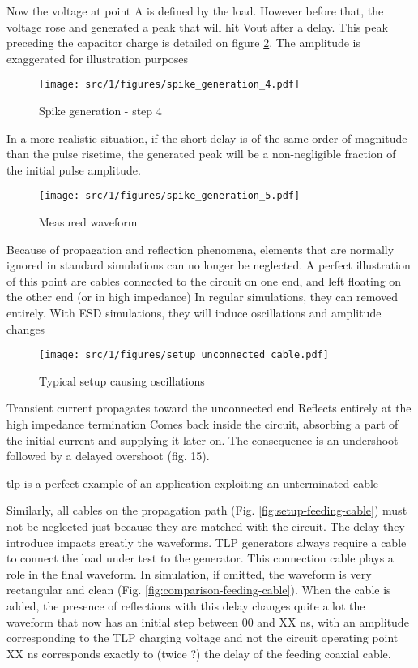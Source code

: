 Now the voltage at point A is defined by the load.
However before that, the voltage rose and generated a peak that will hit Vout after a delay.
This peak preceding the capacitor charge is detailed on figure \ref{fig:spike-step-4}.
The amplitude is exaggerated for illustration purposes

\begin{figure}[!h]
  \centering
  \texttt{[image: src/1/figures/spike\_generation\_4.pdf]}
  \caption{Spike generation - step 4}
  \label{fig:spike-step-4}
\end{figure}

In a more realistic situation, if the short delay is of the same order of magnitude than the pulse risetime, the generated peak will be a non-negligible fraction of the initial pulse amplitude.

\begin{figure}[!h]
  \centering
  \texttt{[image: src/1/figures/spike\_generation\_5.pdf]}
  \caption{Measured waveform}
  \label{fig:spike-step-4}
\end{figure}

Because of propagation and reflection phenomena, elements that are normally ignored in standard simulations can no longer be neglected.
A perfect illustration of this point are cables connected to the circuit on one end, and left floating on the other end (or in high impedance)
In regular simulations, they can removed entirely.
With ESD simulations, they will induce oscillations and amplitude changes

\begin{figure}[!h]
  \centering
  \texttt{[image: src/1/figures/setup\_unconnected\_cable.pdf]}
  \caption{Typical setup causing oscillations}
  \label{fig:setup-unconnected-cable}
\end{figure}

Transient current propagates toward the unconnected end
Reflects entirely at the high impedance termination
Comes back inside the circuit, absorbing a part of the initial current and supplying it later on.
The consequence is an undershoot followed by a delayed overshoot (fig. 15).

\gls{tlp} is a perfect example of an application exploiting an unterminated cable

Similarly, all cables on the propagation path (Fig. \ref{fig:setup-feeding-cable}) must not be neglected just because they are matched with the circuit.
The delay they introduce impacts greatly the waveforms.
TLP generators always require a cable to connect the load under test to the generator.
This connection cable plays a role in the final waveform.
In simulation, if omitted, the waveform is very rectangular and clean (Fig. \ref{fig:comparison-feeding-cable}).
When the cable is added, the presence of reflections with this delay changes quite a lot the waveform that now has an initial step between 00 and XX ns, with an amplitude corresponding to the TLP charging voltage and not the circuit operating point
XX ns corresponds exactly to (twice ?) the delay of the feeding coaxial cable.

